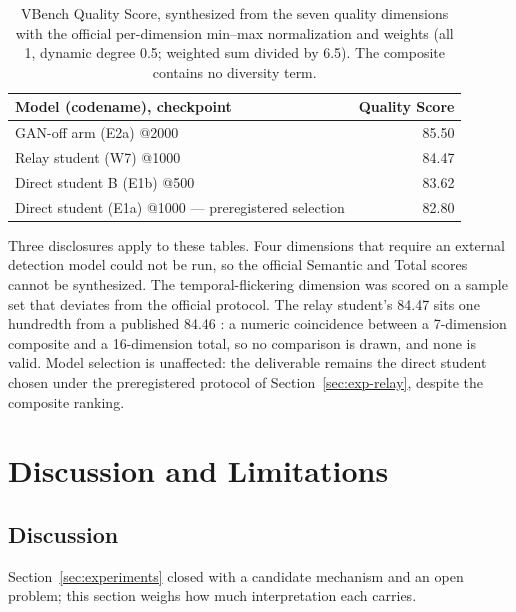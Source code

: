 \documentclass[11pt,a4paper]{article}
\begin{document}
\begin{table}[htbp]
  \centering
  \begin{tabular}{lr}
    \toprule
    Model (codename), checkpoint & Quality Score \\
    \midrule
    GAN-off arm (E2a) @2000 & 85.50 \\
    Relay student (W7) @1000 & 84.47 \\
    Direct student B (E1b) @500 & 83.62 \\
    Direct student (E1a) @1000 — preregistered selection & 82.80 \\
    \bottomrule
  \end{tabular}
  \caption{VBench Quality Score, synthesized from the seven quality dimensions with the official per-dimension min–max normalization and weights (all 1, dynamic degree 0.5; weighted sum divided by 6.5). The composite contains no diversity term.}
  \label{tab:qs}
\end{table}

Three disclosures apply to these tables. Four dimensions that require an external detection model could not be run, so the official Semantic and Total scores cannot be synthesized. The temporal-flickering dimension was scored on a sample set that deviates from the official protocol. The relay student's 84.47 sits one hundredth from a published 84.46 \cite{codmd}: a numeric coincidence between a 7-dimension composite and a 16-dimension total, so no comparison is drawn, and none is valid. Model selection is unaffected: the deliverable remains the direct student chosen under the preregistered protocol of Section~\ref{sec:exp-relay}, despite the composite ranking.

\section{Discussion and Limitations}\label{sec:discussion}

\subsection{Discussion}\label{sec:discussion-discussion}

Section~\ref{sec:experiments} closed with a candidate mechanism and an open problem; this section weighs how much interpretation each carries.
\end{document}
